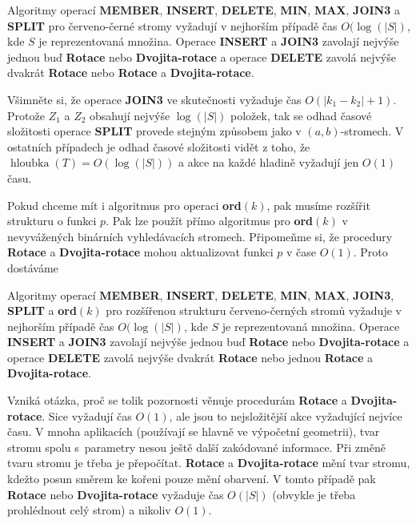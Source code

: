 \documentclass[a4paper,12pt]{article}
\DeclareMathOperator*{\hloubka}{hloubka}
\begin{document}
\begin{veta}Algoritmy operací {\bf MEMBER}, {\bf INSERT}, 
{\bf DE\-LE\-TE}, {\bf MIN}, {\bf MAX}, {\bf JOIN3} a {\bf SPLIT} pro červeno-černé 
stro\-my vyžadují v nejhorším případě čas $O
(\log(|S|)$, kde $S$ je 
reprezentovaná množina.  Operace {\bf INSERT} a {\bf JOIN3} zavolají 
nejvýše jednou buď {\bf Rotace} nebo {\bf Dvojita-rota\-ce} a operace 
{\bf DE\-LE\-TE} zavolá nejvýše dvakrát {\bf Rotace} nebo {\bf Rotace} a 
{\bf Dvojita-ro\-ta\-ce}.  
\end{veta}

Všimněte si, že operace {\bf JOIN3} ve skutečnosti 
vyžaduje čas $O(|k_1-k_2|+1)$. Protože $Z_1$ a $Z_2$ obsahují nejvýše 
$\log(|S|)$ položek, tak se odhad časové složitosti operace {\bf SPLIT }
prove\-de stejným způsobem jako v $(a,b)$-stromech. 
V ostatních pří\-pa\-dech je odhad časové složitosti vidět z toho, 
že $\hloubka(T)=O(\log(|S|))$ a akce na každé hladině vyžadují jen 
$O(1)$ času.

Pokud chceme mít i algoritmus pro operaci {\bf ord$
(k)$}, pak 
musíme rozšířit strukturu o funkci $p$. Pak lze použít přímo 
algoritmus pro {\bf ord$(k)$} v nevyvážených binárních vyhledávacích 
stromech. Připomeňme si, že procedury {\bf Rotace} a {\bf Dvojita-rotace }
mohou aktualizovat funkci $p$ v čase $O(1)$. Proto dostáváme 

\begin{veta}Algoritmy operací {\bf MEMBER}, 
{\bf INSERT}, {\bf DE\-LE\-TE}, {\bf MIN}, {\bf MAX}, {\bf JOIN3}, {\bf SPLIT} a {\bf ord$
(k)$} pro 
roz\-ší\-ře\-nou strukturu červeno-černých stromů vyžaduje 
v nejhorším případě čas $O(\log(|S|)$, kde $S$ je reprezentovaná 
množina.  Operace {\bf INSERT} a {\bf JOIN3} zavolají nejvýše jednou buď 
{\bf Rotace} nebo {\bf Dvojita-rota\-ce} a operace {\bf DELETE} zavolá nejvýše 
dvakrát {\bf Rotace} nebo jednou {\bf Rotace} a {\bf Dvojita-rotace}.  \end{veta}

Vzniká otázka, proč se tolik pozornosti věnuje 
procedurám {\bf Rotace} a {\bf Dvojita-rotace}. Sice vyžadují čas 
$O(1)$, ale jsou to nej\-složitější akce vyžadující nejvíce času. 
V mnoha aplikacích (pou\-žívají se hlavně ve výpočetní geometrii), 
tvar stromu spolu s~parametry nesou ještě 
další zakódované informace. Při změně tvaru stromu je 
třeba je přepočítat. {\bf Rotace} a {\bf Dvojita-rotace} mění tvar 
stromu, kdežto posun směrem ke kořeni pouze mění 
obarvení. V tomto případě pak {\bf Rotace} nebo {\bf Dvo\-ji\-ta-rotace }
vyžaduje čas $O(|S|)$ (obvykle je třeba prohlédnout celý 
strom) a nikoliv $O(1)$.
\end{document}
